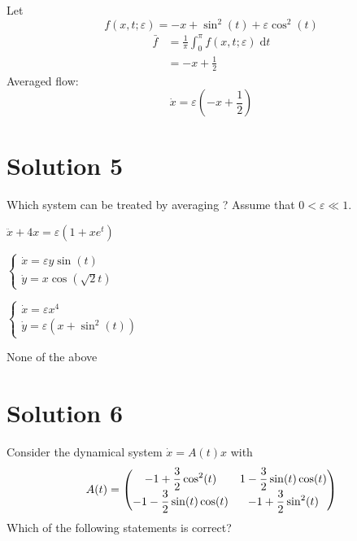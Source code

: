 \documentclass[twoside,10pt,a4paper]{article}
\begin{document}
{\color{MyRed}
Let
\begin{equation*}
	f(x,t; \varepsilon) = -x + \sin^2(t) + \varepsilon \cos^2(t)
\end{equation*}
\begin{align*}
	\bar{f} &= \frac{1}{\pi} \int_0^\pi f(x,t; \varepsilon) \; \text{d}t \\
	&= -x + \frac{1}{2}
\end{align*}
Averaged flow:
\begin{equation*}
	\dot{x} = \varepsilon \left( -x + \frac{1}{2} \right)
\end{equation*}
}

\section*{Solution 5}
Which system can be treated by averaging ? Assume that $0 < \varepsilon \ll 1$.

\begin{enumerate}[label=(\alph*)]
	\item $ \ddot{x} + 4x = \varepsilon(1 + x e^t) $
	\item $ \displaystyle \begin{cases}
		\dot{x} = \varepsilon y \sin(t) \\
		\dot{y} = x \cos(\sqrt{2}t)
	\end{cases} $
	{\color{MyRed}\item $ \displaystyle \begin{cases}
		\dot{x} = \varepsilon x^4 \\
		\dot{y} = \varepsilon(x + \sin^2(t))
	\end{cases} $}
	\item None of the above
\end{enumerate}

\section*{Solution 6}
Consider the dynamical system $ \dot{x} = A(t)x $ with
\begin{equation*}
	A(t) = {\renewcommand*{\arraystretch}{1.25}\begin{pmatrix}
		\displaystyle -1 + \frac{3}{2}\cos^2(t) & \displaystyle 1 - \frac{3}{2} \sin(t)\cos(t) \\
		\displaystyle -1 - \frac{3}{2} \sin(t)\cos(t) & \displaystyle -1 + \frac{3}{2} \sin^2(t)
	\end{pmatrix}}
\end{equation*}
Which of the following statements is correct?
\end{document}
